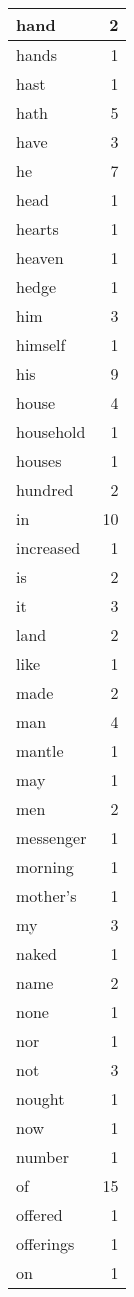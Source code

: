 \begin{center}
\begin{longtable}{l|r}
hand & 2\\ \hline 
hands & 1\\ \hline 
hast & 1\\ \hline 
hath & 5\\ \hline 
have & 3\\ \hline 
he & 7\\ \hline 
head & 1\\ \hline 
hearts & 1\\ \hline 
heaven & 1\\ \hline 
hedge & 1\\ \hline 
him & 3\\ \hline 
himself & 1\\ \hline 
his & 9\\ \hline 
house & 4\\ \hline 
household & 1\\ \hline 
houses & 1\\ \hline 
hundred & 2\\ \hline 
in & 10\\ \hline 
increased & 1\\ \hline 
is & 2\\ \hline 
it & 3\\ \hline 
land & 2\\ \hline 
like & 1\\ \hline 
made & 2\\ \hline 
man & 4\\ \hline 
mantle & 1\\ \hline 
may & 1\\ \hline 
men & 2\\ \hline 
messenger & 1\\ \hline 
morning & 1\\ \hline 
mother's & 1\\ \hline 
my & 3\\ \hline 
naked & 1\\ \hline 
name & 2\\ \hline 
none & 1\\ \hline 
nor & 1\\ \hline 
not & 3\\ \hline 
nought & 1\\ \hline 
now & 1\\ \hline 
number & 1\\ \hline 
of & 15\\ \hline 
offered & 1\\ \hline 
offerings & 1\\ \hline 
on & 1\\ \hline 

\end{longtable}
\end{center}
